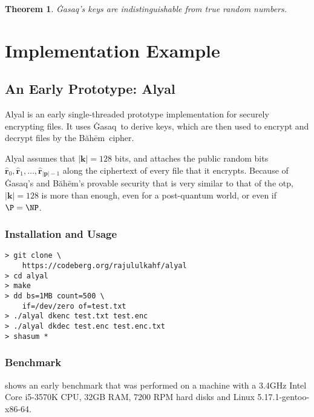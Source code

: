 \documentclass[twocolumn,hidelinks]{article}
\newcommand{\ghasaq}{Ġasaq}
\newcommand{\baheem}{Băhēm}
\newtheorem{theorem}{Theorem}[section]
\begin{document}
\begin{theorem}
    \ghasaq's keys are indistinguishable from true random numbers.
\end{theorem}

\section{Implementation Example}

\subsection{An Early Prototype:  Alyal}
Alyal is an early single-threaded prototype implementation for securely
encrypting files.  It uses \ghasaq\ to derive keys, which are then used to
encrypt and decrypt files by the \baheem\ cipher.

Alyal assumes that $|\mathbf{k}| = 128$ bits, and attaches the public
random bits $\mathbf{\hat r}_0, \mathbf{\hat r}_1, \ldots, \mathbf{\hat
r}_{|\mathbf{p}|-1}$ along the ciphertext of every file that it encrypts.
Because of \ghasaq's and \baheem's provable security that is very similar
to that of the \gls{otp}, $|\mathbf{k}| = 128$ is more than enough, even
for a post-quantum world, or even if $\P = \NP$.

\subsubsection{Installation and Usage}
\begin{verbatim}
> git clone \
    https://codeberg.org/rajululkahf/alyal
> cd alyal
> make
> dd bs=1MB count=500 \
    if=/dev/zero of=test.txt
> ./alyal dkenc test.txt test.enc
> ./alyal dkdec test.enc test.enc.txt
> shasum *
\end{verbatim}

\subsubsection{Benchmark}
 shows an early benchmark that was performed on a
machine with a 3.4GHz Intel Core i5-3570K CPU, 32GB RAM, 7200 RPM hard
disks and Linux 5.17.1-gentoo-x86-64.
\end{document}
